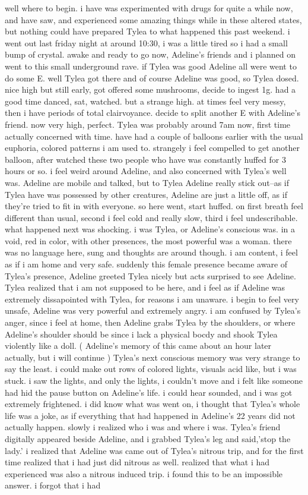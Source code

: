 \documentclass[12pt]{book}
\begin{document}
well where to begin. i have was experimented with drugs for quite a while now, and have saw, and experienced some amazing things while in these altered states, but nothing could have prepared Tylea to what happened this past weekend. i went out last friday night at around 10:30, i was a little tired so i had a small bump of crystal. awake and ready to go now, Adeline's friends and i planned on went to this small underground rave. if Tylea was good Adeline all were went to do some E. well Tylea got there and of course Adeline was good, so Tylea dosed. nice high but still early, got offered some mushrooms, decide to ingest 1g. had a good time danced, sat, watched. but a strange high. at times feel very messy, then i have periods of total clairvoyance. decide to split another E with Adeline's friend. now very high, perfect. Tylea was probably around 7am now, first time actually concerned with time. have had a couple of balloons earlier with the usual euphoria, colored patterns i am used to. strangely i feel compelled to get another balloon, after watched these two people who have was constantly huffed for 3 hours or so. i feel weird around Adeline, and also concerned with Tylea's well was. Adeline are mobile and talked, but to Tylea Adeline really stick out--as if Tylea have was possessed by other creatures, Adeline are just a little off, as if they're tried to fit in with everyone. so here went, start huffed. on first breath feel different than usual, second i feel cold and really slow, third i feel undescribable. what happened next was shocking. i was Tylea, or Adeline's conscious was. in a void, red in color, with other presences, the most powerful was a woman. there was no language here, sung and thoughts are around though. i am content, i feel as if i am home and very safe. suddenly this female presence became aware of Tylea's presence, Adeline greeted Tylea nicely but acts surprised to see Adeline. Tylea realized that i am not supposed to be here, and i feel as if Adeline was extremely dissapointed with Tylea, for reasons i am unaware. i begin to feel very unsafe, Adeline was very powerful and extremely angry. i am confused by Tylea's anger, since i feel at home, then Adeline grabs Tylea by the shoulders, or where Adeline's shoulder should be since i lack a physical bocdy and shook Tylea violently like a doll. ( Adeline's memory of this came about an hour later actually, but i will continue ) Tylea's next conscious memory was very strange to say the least. i could make out rows of colored lights, visuals acid like, but i was stuck. i saw the lights, and only the lights, i couldn't move and i felt like someone had hid the pause button on Adeline's life. i could hear sounded, and i was got extremely frightened. i did know what was went on, i thought that Tylea's whole life was a joke, as if everything that had happened in Adeline's 22 years did not actually happen. slowly i realized who i was and where i was. Tylea's friend digitally appeared beside Adeline, and i grabbed Tylea's leg and said,'stop the lady.' i realized that Adeline was came out of Tylea's nitrous trip, and for the first time realized that i had just did nitrous as well. realized that what i had experienced was also a nitrous induced trip. i found this to be an impossible answer. i forgot that i had 
\end{document}
